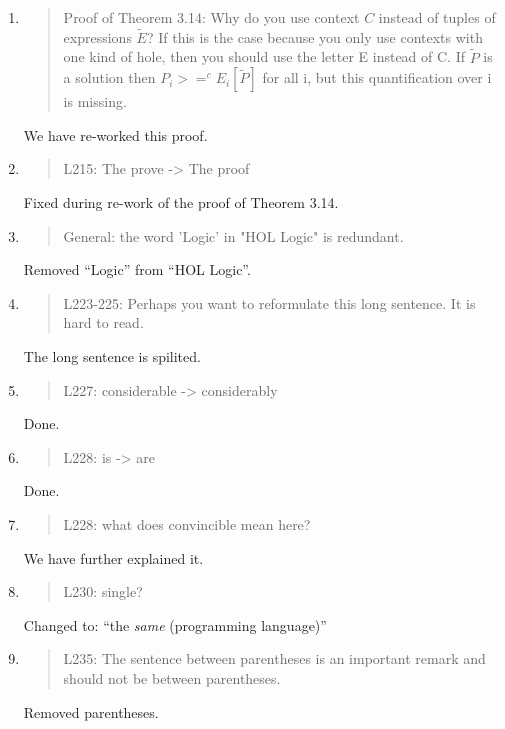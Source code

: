 \begin{enumerate}
\item \begin{quote}
    Proof of Theorem 3.14: Why do you use context $C$ instead of tuples of expressions $\tilde{E}$?
    If this is the case because you only use contexts with one kind of hole, then you should use the letter
    E instead of C.
    If $\tilde{P}$ is a solution then $P_i >=^c E_i[\tilde{P}]$ for all i, but this quantification over i is missing.
  \end{quote}
   \Mark
 We have  re-worked this proof.

\item \begin{quote}
    L215: The prove -> The proof
  \end{quote}
  \Mark
  Fixed during re-work of the proof of Theorem 3.14.
  
\item \begin{quote}
    General: the word 'Logic' in "HOL Logic" is redundant.
  \end{quote}
  \Mark
  Removed ``Logic'' from ``HOL Logic''.
  
\item \begin{quote}
    L223-225: Perhaps you want to reformulate this long sentence. It is hard to read.
  \end{quote}
  \Mark
  The long sentence is spilited.
  
\item \begin{quote}
    L227: considerable -> considerably
  \end{quote}
  \Mark
  Done.
 
\item \begin{quote}
    L228: is -> are
  \end{quote}
  \Mark
  Done.
  
\item \begin{quote}
    L228: what does convincible mean here?
  \end{quote}
  \Mark
  We have further explained it.
  
\item \begin{quote}
    L230: single?
  \end{quote}
  \Mark
  Changed to: ``the \emph{same} (programming language)''
  
\item \begin{quote}
    L235: The sentence between parentheses is an important remark and
    should not be between parentheses.
  \end{quote}
  \Mark
  Removed parentheses.
  

\end{enumerate}
